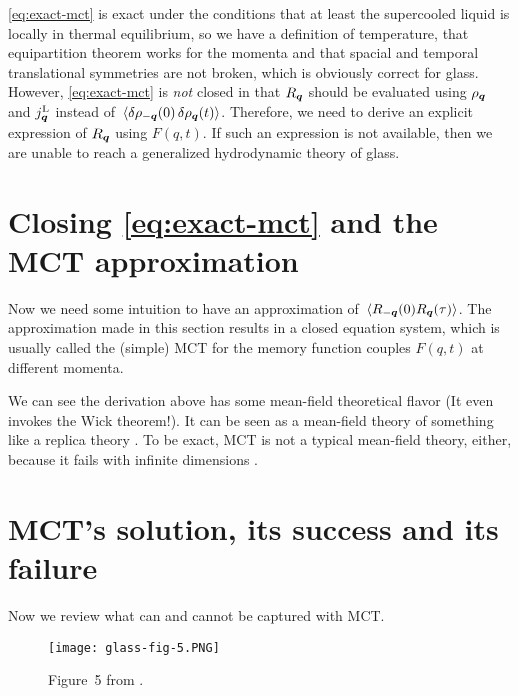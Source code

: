 \documentclass[hyperref, a4paper]{article}
\begin{document}
\eqref{eq:exact-mct} is exact under the conditions that at least the supercooled liquid is locally in thermal
equilibrium, so we have a definition of temperature, that equipartition theorem works for the momenta 
and that spacial and temporal translational symmetries are not broken, which is obviously correct for glass. 
However, \eqref{eq:exact-mct} is \emph{not} closed in that $R_{\vb*{q}}$ should be evaluated using $\rho_{\vb*{q}}$
and $j^\text{L}_{\vb*{q}}$ instead of $\expval*{\var{\rho_{-\vb*{q}}(0)} \var{\rho_{\vb*{q}}(t)}}$. 
Therefore, we need to derive an explicit expression of $R_{\vb*{q}}$ using $F(q, t)$. 
If such an expression is not available, then we are unable to reach a generalized hydrodynamic theory 
of glass. 

\section{Closing \eqref{eq:exact-mct} and the MCT approximation}

Now we need some intuition to have an approximation of $\expval*{R_{-\vb*{q}}(0) R_{\vb*{q}}(\tau)}$.
The approximation made in this section results in a closed equation system, which is usually called 
the (simple) MCT for the memory function couples $F(q, t)$ at different momenta.

We can see the derivation above has some mean-field theoretical flavor (It even invokes the Wick theorem!). 
It can be seen as a mean-field theory of something like a replica theory \cite{Franz_2012}. To be exact,
MCT is not a typical mean-field theory, either, because it fails with infinite dimensions \cite{mct-mft-2010}.

\section{MCT's solution, its success and its failure}

Now we review what can and cannot be captured with MCT. 

\begin{figure}
    \centering
    \texttt{[image: glass-fig-5.PNG]}
    \caption{Figure~5 from \cite{mct2005}.}
\end{figure}
\end{document}
